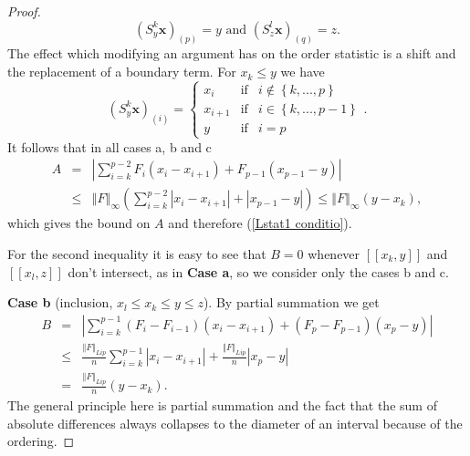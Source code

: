 \documentclass[final,12pt]{colt2018} %
\begin{document}
\begin{proof}
							\[
							\left( S_{y}^{k}\mathbf{x}\right) _{\left( p\right) }=y\text{ and }\left(
							S_{z}^{l}\mathbf{x}\right) _{\left( q\right) }=z\text{.}
							\]%
							The effect which modifying an argument has on the order statistic is a shift
							and the replacement of a boundary term. For $x_{k}\leq y$ we have%
							\[
							\left( S_{y}^{k}\mathbf{x}\right) _{\left( i\right) }=\left\{ 
							\begin{array}{ccc}
							x_{i} & \text{if} & i\notin \left\{ k,...,p\right\}  \\ 
							x_{i+1} & \text{if} & i\in \left\{ k,...,p-1\right\}  \\ 
							y & \text{if} & i=p%
							\end{array}%
							\right. \text{.}
							\]%
							It follows that in all cases a, b and c 
							\begin{eqnarray*}
								A &=&\left\vert \sum_{i=k}^{p-2}F_{i}\left( x_{i}-x_{i+1}\right)
								+F_{p-1}\left( x_{p-1}-y\right) \right\vert  \\
								&\leq &\left\Vert F\right\Vert _{\infty }\left( \sum_{i=k}^{p-2}\left\vert
								x_{i}-x_{i+1}\right\vert +\left\vert x_{p-1}-y\right\vert \right) \leq
								\left\Vert F\right\Vert _{\infty }\left( y-x_{k}\right) ,
							\end{eqnarray*}%
							which gives the bound on $A$ and therefore (\ref{Lstat1 conditio}).
							
							For the second inequality it is easy to see that $B=0$ whenever $\left[ %
							\left[ x_{k},y\right] \right] $ and $\left[ \left[ x_{l},z\right] \right] $
							don't intersect, as in \textbf{Case a}, so we consider only the cases b and
							c.
							
							\textbf{Case b} (inclusion, $x_{l}\leq x_{k}\leq y\leq z$). By partial
							summation we get%
							\begin{eqnarray*}
								B &=&\left\vert \sum_{i=k}^{p-1}\left( F_{i}-F_{i-1}\right) \left(
								x_{i}-x_{i+1}\right) +\left( F_{p}-F_{p-1}\right) \left( x_{p}-y\right)
								\right\vert  \\
								&\leq &\frac{\left\Vert F\right\Vert _{Lip}}{n}\sum_{i=k}^{p-1}\left\vert
								x_{i}-x_{i+1}\right\vert +\frac{\left\Vert F\right\Vert _{Lip}}{n}\left\vert
								x_{p}-y\right\vert  \\
								&=&\frac{\left\Vert F\right\Vert _{Lip}}{n}\left( y-x_{k}\right) .
							\end{eqnarray*}%
							The general principle here is partial summation and the fact that the sum of
							absolute differences always collapses to the diameter of an interval because
							of the ordering. 
							

\end{proof}
\end{document}
